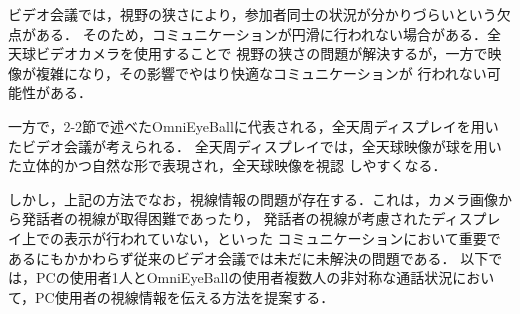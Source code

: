 



ビデオ会議では，視野の狭さにより，参加者同士の状況が分かりづらいという欠点がある．
そのため，コミュニケーションが円滑に行われない場合がある．全天球ビデオカメラを使用することで
視野の狭さの問題が解決するが，一方で映像が複雑になり，その影響でやはり快適なコミュニケーションが
行われない可能性がある．

一方で，2-2節で述べたOmniEyeBallに代表される，全天周ディスプレイを用いたビデオ会議が考えられる．
全天周ディスプレイでは，全天球映像が球を用いた立体的かつ自然な形で表現され，全天球映像を視認
しやすくなる．

しかし，上記の方法でなお，視線情報の問題が存在する．これは，カメラ画像から発話者の視線が取得困難であったり，
発話者の視線が考慮されたディスプレイ上での表示が行われていない，といった
コミュニケーションにおいて重要であるにもかかわらず従来のビデオ会議では未だに未解決の問題である．
以下では，PCの使用者1人とOmniEyeBallの使用者複数人の非対称な通話状況において，PC使用者の視線情報を伝える方法を提案する．



